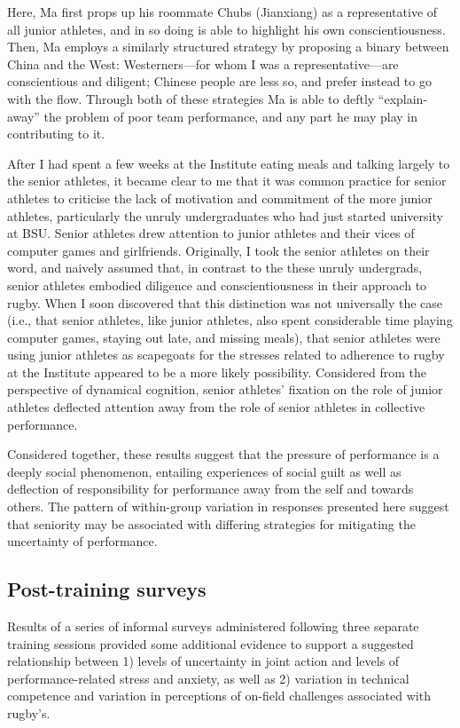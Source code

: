 \begin{CJK}{UTF8}{gbsn}
Here, Ma first props up his roommate Chubs (Jianxiang) as a representative of all junior athletes, and in so doing is able to highlight his own conscientiousness.  Then, Ma employs a similarly structured strategy by proposing a binary between China and the West: Westerners---for whom I was a representative---are conscientious and diligent; Chinese people are less so, and prefer instead to go with the flow.  Through both of these strategies Ma is able to deftly ``explain-away'' the problem of poor team performance, and any part he may play in contributing to it.

After I had spent a few weeks at the Institute eating meals and talking largely to the senior athletes, it became clear to me that it was common practice for senior athletes to criticise the lack of motivation and commitment of the more junior athletes, particularly the unruly undergraduates who had just started university at BSU.  Senior athletes drew attention to junior athletes and their vices of computer games and girlfriends.  Originally, I took the senior athletes on their word, and naively assumed that, in contrast to the these unruly undergrads, senior athletes embodied diligence and conscientiousness in their approach to rugby.  When I soon discovered that this distinction was not universally the case (i.e., that senior athletes, like junior athletes, also spent considerable time playing computer games, staying out late, and missing meals), that senior athletes were using junior athletes as scapegoats for the stresses related to adherence to rugby at the Institute appeared to be a more likely possibility.  Considered from the perspective of dynamical cognition, senior athletes' fixation on the role of junior athletes deflected attention away from the role of senior athletes in collective performance.

Considered together, these results suggest that the pressure of performance is a deeply social phenomenon, entailing experiences of social guilt as well as deflection of responsibility for performance away from the self and towards others.  The pattern of within-group variation in responses presented here suggest that seniority may be associated with differing strategies for mitigating the uncertainty of performance.



\subsection{Post-training surveys\label{sect:postTrainingSurvey}}
Results of a series of informal surveys administered following three separate training sessions provided some additional evidence to support a suggested relationship between 1) levels of uncertainty in joint action and levels of performance-related stress and anxiety, as well as 2) variation in technical competence and variation in perceptions of on-field challenges associated with rugby's.


\end{CJK}
